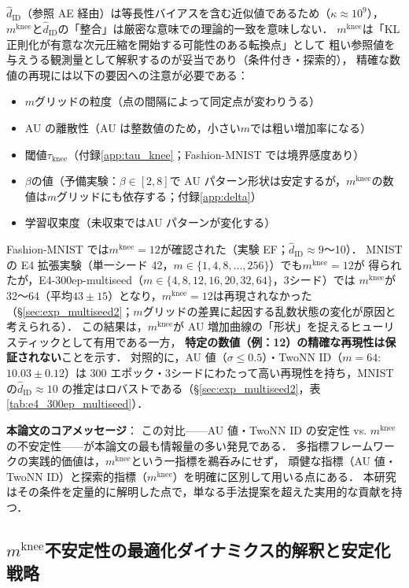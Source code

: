 \documentclass[11pt,a4paper]{jsarticle}
\newcommand{\kap}{\kappa}
\newcommand{\mknee}{m^{\mathrm{knee}}}
\begin{document}
$\hat{d}_\mathrm{ID}$（参照 AE 経由）は等長性バイアスを含む近似値であるため（$\kap \approx 10^9$），
$\mknee$と$\hat{d}_\mathrm{ID}$の「整合」は厳密な意味での理論的一致を意味しない．
$\mknee$は「KL 正則化が有意な次元圧縮を開始する可能性のある転換点」として
粗い参照値を与えうる観測量として解釈するのが妥当であり（条件付き・探索的），
精確な数値の再現には以下の要因への注意が必要である：
\begin{itemize}
  \item $m$グリッドの粒度（点の間隔によって同定点が変わりうる）
  \item AU の離散性（AU は整数値のため，小さい$m$では粗い増加率になる）
  \item 閾値$\tau_{\mathrm{knee}}$（付録\ref{app:tau_knee}；Fashion-MNIST では境界感度あり）
  \item $\beta$の値（予備実験：$\beta \in [2, 8]$で AU パターン形状は安定するが，$\mknee$の数値は$m$グリッドにも依存する；付録\ref{app:delta}）
  \item 学習収束度（未収束ではAU パターンが変化する）
\end{itemize}

Fashion-MNIST では$\mknee = 12$が確認された（実験 EF；$\hat{d}_\mathrm{ID} \approx 9$〜10）．
MNIST の E4 拡張実験（単一シード 42，$m \in \{1, 4, 8, \ldots, 256\}$）でも$\mknee = 12$が
得られたが，E4-300ep-multiseed（$m \in \{4, 8, 12, 16, 20, 32, 64\}$，3シード）では
$\mknee$が 32〜64（平均$43 \pm 15$）となり，$\mknee = 12$は再現されなかった
（§\ref{sec:exp_multiseed2}；$m$グリッドの差異に起因する乱数状態の変化が原因と考えられる）．
この結果は，$\mknee$が AU 増加曲線の「形状」を捉えるヒューリスティックとして有用である一方，
\textbf{特定の数値（例：12）の精確な再現性は保証されない}ことを示す．
対照的に，AU 値（$\sigma \leq 0.5$）・TwoNN ID（$m=64$: $10.03 \pm 0.12$）は
300 エポック・3シードにわたって高い再現性を持ち，MNIST の$\hat{d}_\mathrm{ID} \approx 10$
の推定はロバストである（§\ref{sec:exp_multiseed2}，表\ref{tab:e4_300ep_multiseed}）．

\textbf{本論文のコアメッセージ}：
この対比——AU 値・TwoNN ID の安定性 vs. $\mknee$の不安定性——が本論文の最も情報量の多い発見である．
多指標フレームワークの実践的価値は，$\mknee$という一指標を鵜呑みにせず，
頑健な指標（AU 値・TwoNN ID）と探索的指標（$\mknee$）を明確に区別して用いる点にある．
本研究はその条件を定量的に解明した点で，単なる手法提案を超えた実用的な貢献を持つ．

\subsection{$\mknee$不安定性の最適化ダイナミクス的解釈と安定化戦略}\label{sec:disc_mknee_improve}
\end{document}
